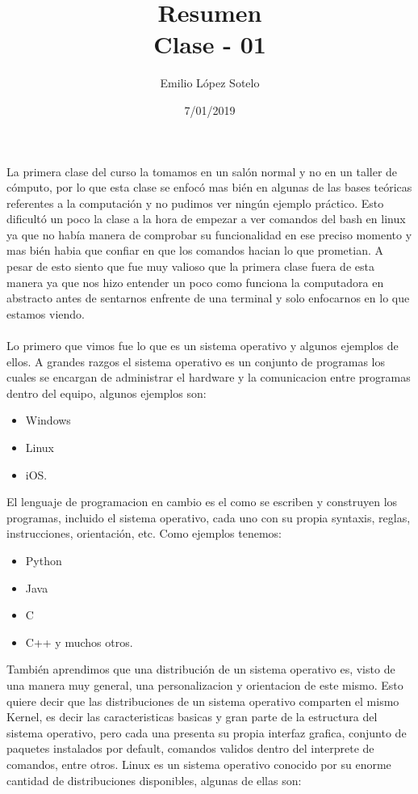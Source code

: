 \documentclass[letterpaper, 12pt, oneside]{article}
\title{Resumen\\Clase - 01}
\author{Emilio López Sotelo}
\date{7/01/2019}
\begin{document}
	\maketitle
	La primera clase del curso la tomamos en un salón normal y no en un taller de cómputo, por lo que esta clase se enfocó mas bién en algunas de las bases teóricas referentes a la computación y no pudimos ver ningún ejemplo práctico. Esto dificultó un poco la clase a la hora de empezar a ver comandos del bash en linux ya que no había manera de comprobar su funcionalidad en ese preciso momento y mas bién habia que confiar en que los comandos hacian lo que prometian. A pesar de esto siento que fue muy valioso que la primera clase fuera de esta manera ya que nos hizo entender un poco como funciona la computadora en abstracto antes de sentarnos enfrente de una terminal y solo enfocarnos en lo que estamos viendo.
	\\
	\\ 
	Lo primero que vimos fue lo que es un sistema operativo y algunos ejemplos de ellos. A grandes razgos el sistema operativo es un conjunto de programas los cuales se encargan de administrar el hardware y la comunicacion entre programas dentro del equipo, algunos ejemplos son:
	\\
	\begin{itemize}
		\item Windows
		\item Linux
		\item iOS.
	\\
	\end{itemize}
	El lenguaje de programacion en cambio es el como se escriben y construyen los programas, incluido el sistema operativo, cada uno con su propia syntaxis, reglas, instrucciones, orientación, etc. Como ejemplos tenemos:
	\\
	\begin{itemize}
		\item Python
		\item Java
		\item C
		\item C++ y muchos otros.
	\\
	\end{itemize}
	También aprendimos que una distribución de un sistema operativo es, visto de una manera muy general, una personalizacion y orientacion de este mismo. Esto quiere decir que las distribuciones de un sistema operativo comparten el mismo Kernel, es decir las caracteristicas basicas y gran parte de la estructura del sistema operativo, pero cada una presenta su propia interfaz grafica, conjunto de paquetes instalados por default, comandos validos dentro del interprete de comandos, entre otros. Linux es un sistema operativo conocido por su enorme cantidad de distribuciones disponibles, algunas de ellas son:
\end{document}
